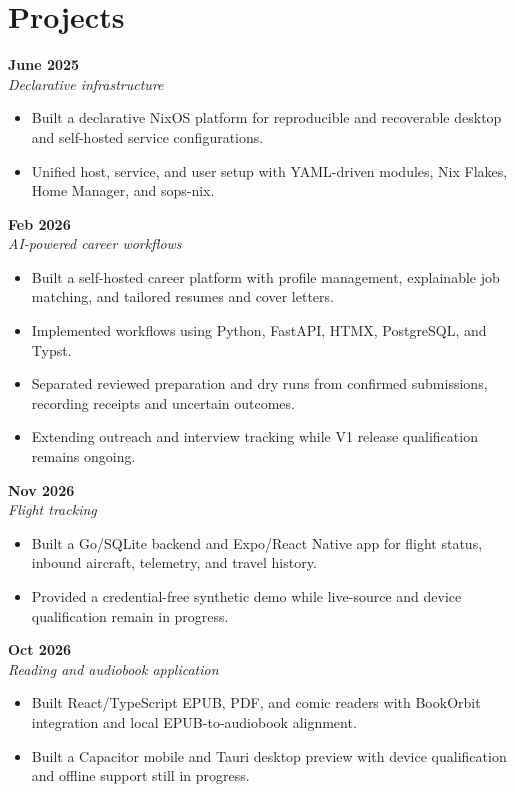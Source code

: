 \documentclass[10pt, letterpaper]{article}
\newcommand{\projectentry}[2]{
  \noindent{#1} \hfill \textbf{#2}
}
\begin{document}
\section{Projects}

\projectentry{Lumino}{June 2025}\\
\textit{Declarative infrastructure}
\begin{itemize}
\item Built a declarative NixOS platform for reproducible and recoverable desktop and self-hosted service configurations.
\item Unified host, service, and user setup with YAML-driven modules, Nix Flakes, Home Manager, and sops-nix.
\end{itemize}

\projectentry{Naavik}{Feb 2026}\\
\textit{AI-powered career workflows}
\begin{itemize}
\item Built a self-hosted career platform with profile management, explainable job matching, and tailored resumes and cover letters.
\item Implemented workflows using Python, FastAPI, HTMX, PostgreSQL, and Typst.
\item Separated reviewed preparation and dry runs from confirmed submissions, recording receipts and uncertain outcomes.
\item Extending outreach and interview tracking while V1 release qualification remains ongoing.
\end{itemize}

\projectentry{Plano}{Nov 2026}\\
\textit{Flight tracking}
\begin{itemize}
\item Built a Go/SQLite backend and Expo/React Native app for flight status, inbound aircraft, telemetry, and travel history.
\item Provided a credential-free synthetic demo while live-source and device qualification remain in progress.
\end{itemize}

\projectentry{Avid}{Oct 2026}\\
\textit{Reading and audiobook application}
\begin{itemize}
\item Built React/TypeScript EPUB, PDF, and comic readers with BookOrbit integration and local EPUB-to-audiobook alignment.
\item Built a Capacitor mobile and Tauri desktop preview with device qualification and offline support still in progress.
\end{itemize}
\end{document}
